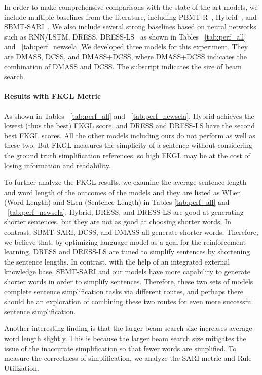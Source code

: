\documentclass[11pt,a4paper]{article}
\begin{document}
In order to make comprehensive comparisons with the state-of-the-art models, we include multiple baselines from the literature, including PBMT-R~\cite{wubben2012sentence}, Hybrid~\cite{narayan2014hybrid}, and SBMT-SARI~\cite{xu2016optimizing}. We also include several strong baselines based on neural networks such as RNN/LSTM, DRESS, DRESS-LS~\cite{zhang2017sentence} as shown in Tables ~\ref{tab:perf_all} and ~\ref{tab:perf_newsela}
We developed three models for this experiment. They are DMASS, DCSS, and DMASS+DCSS, where DMASS+DCSS indicates the combination of DMASS and DCSS. The subscript  indicates the size of beam search. 


\paragraph{Results with FKGL Metric}

As shown in Tables ~\ref{tab:perf_all} and ~\ref{tab:perf_newsela}, Hybrid achieves the lowest (thus the best) FKGL score, and DRESS and DRESS-LS have the second best FKGL scores. All the other models including ours do not perform as well as these two. But FKGL measures the simplicity of a sentence without considering the ground truth simplification references, so high FKGL may be at the cost of losing information and readability.

To further analyze the FKGL results, we examine the average sentence length and word length of the outcomes of the models and they are listed as WLen (Word Length) and SLen (Sentence Length) in Tables \ref{tab:perf_all} and ~\ref{tab:perf_newsela}. Hybrid, DRESS, and DRESS-LS are good at generating shorter sentences, but they are not as good at choosing shorter words. In contrast, SBMT-SARI, DCSS, and DMASS all generate shorter words. Therefore, we believe that, by optimizing language model as a goal for the reinforcement learning, DRESS and DRESS-LS are tuned to simplify sentences by shortening the sentence lengths. 
In contrast, with the help of an integrated external knowledge base, SBMT-SARI and our models have more capability to generate shorter words in order to simplify sentences. Therefore, these two sets of models complete sentence simplification tasks via different routes, and perhaps there should be an exploration of combining these two routes for even more successful sentence simplification.

Another interesting finding is that the larger beam search size increases average word length slightly. This is because the larger beam search size mitigates the issue of the inaccurate simplification so that fewer words are simplified.
To measure the correctness of simplification, we analyze the SARI metric and Rule Utilization.
\end{document}
